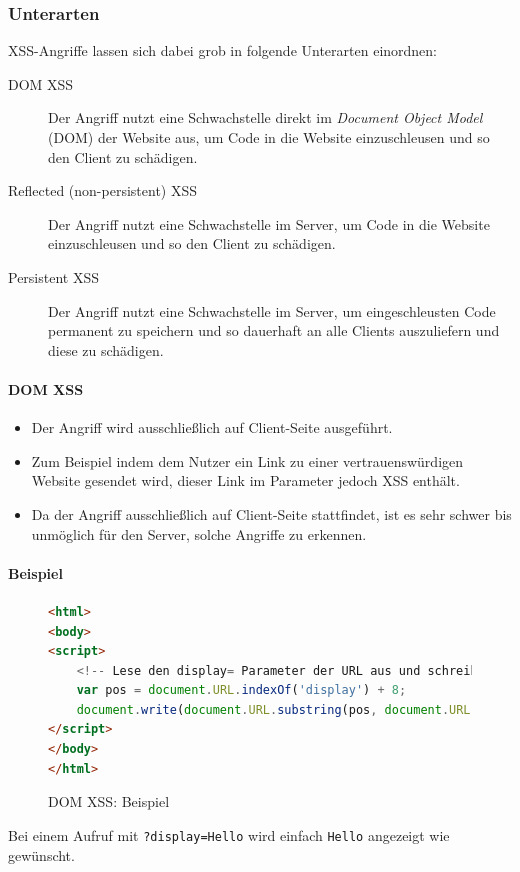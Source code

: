\documentclass[a4paper, 11pt, accentcolor = tud3b]{tudreport}
\begin{document}
				\subsubsection{Unterarten}
					XSS-Angriffe lassen sich dabei grob in folgende Unterarten einordnen:
					\begin{description}
						\item[DOM XSS] Der Angriff nutzt eine Schwachstelle direkt im \textit{Document Object Model} (DOM) der Website aus, um Code in die Website einzuschleusen und so den Client zu schädigen.
						\item[Reflected (non-persistent) XSS] Der Angriff nutzt eine Schwachstelle im Server, um Code in die Website einzuschleusen und so den Client zu schädigen.
						\item[Persistent XSS] Der Angriff nutzt eine Schwachstelle im Server, um eingeschleusten Code permanent zu speichern und so dauerhaft an alle Clients auszuliefern und diese zu schädigen.
					\end{description}
					
					\paragraph{DOM XSS}
						\begin{itemize}
							\item Der Angriff wird ausschließlich auf Client-Seite ausgeführt.
							\item Zum Beispiel indem dem Nutzer ein Link zu einer vertrauenswürdigen Website gesendet wird, dieser Link im Parameter jedoch XSS enthält.
							\item Da der Angriff ausschließlich auf Client-Seite stattfindet, ist es sehr schwer bis unmöglich für den Server, solche Angriffe zu erkennen.
						\end{itemize}
					
						\paragraph{Beispiel}
							\begin{figure}[H]
								\centering
								\begin{lstlisting}[language = HTML]
<html>
<body>
<script>
	<!-- Lese den display= Parameter der URL aus und schreibe den Inhalt in das DOM. -->
	var pos = document.URL.indexOf('display') + 8;
	document.write(document.URL.substring(pos, document.URL.length));
</script>
</body>
</html>
\end{lstlisting}
								\caption{DOM XSS: Beispiel}
							\end{figure}
							Bei einem Aufruf mit \texttt{?display=Hello} wird einfach \texttt{Hello} angezeigt wie gewünscht.
							
\end{document}
